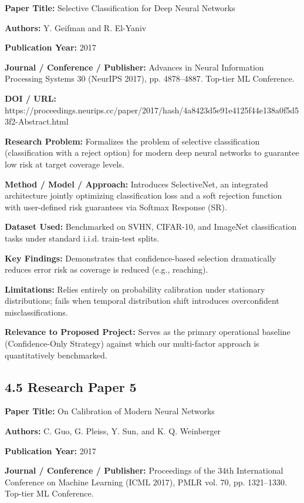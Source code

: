\textbf{Paper Title:} Selective Classification for Deep Neural Networks

\textbf{Authors:} Y. Geifman and R. El-Yaniv

\textbf{Publication Year:} 2017

\textbf{Journal / Conference / Publisher:} Advances in Neural Information Processing Systems 30 (NeurIPS 2017), pp. 4878--4887. Top-tier ML Conference.

\textbf{DOI / URL:} https://proceedings.neurips.cc/paper/2017/hash/4a8423d5e91e4125f44e138a0f5d53f2-Abstract.html

\textbf{Research Problem:} Formalizes the problem of selective classification (classification with a reject option) for modern deep neural networks to guarantee low risk at target coverage levels.

\textbf{Method / Model / Approach:} Introduces SelectiveNet, an integrated architecture jointly optimizing classification loss and a soft rejection function with user-defined risk guarantees via Softmax Response (SR).

\textbf{Dataset Used:} Benchmarked on SVHN, CIFAR-10, and ImageNet classification tasks under standard i.i.d. train-test splits.

\textbf{Key Findings:} Demonstrates that confidence-based selection dramatically reduces error risk as coverage is reduced (e.g., reaching).

\textbf{Limitations:} Relies entirely on probability calibration under stationary distributions; fails when temporal distribution shift introduces overconfident misclassifications.

\textbf{Relevance to Proposed Project:} Serves as the primary operational baseline (Confidence-Only Strategy) against which our multi-factor approach is quantitatively benchmarked.

\subsection{4.5 Research Paper 5}

\textbf{Paper Title:} On Calibration of Modern Neural Networks

\textbf{Authors:} C. Guo, G. Pleiss, Y. Sun, and K. Q. Weinberger

\textbf{Publication Year:} 2017

\textbf{Journal / Conference / Publisher:} Proceedings of the 34th International Conference on Machine Learning (ICML 2017), PMLR vol. 70, pp. 1321--1330. Top-tier ML Conference.

